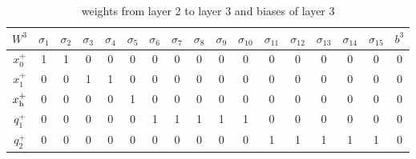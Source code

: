 \begin{table}[t]
	\centering
	\begin{tabular}{|c| c c c c c c c c c c c c c c c |c|}
		\hline 
		$W^3$ & $\sigma_1$ & $\sigma_2$ & $\sigma_3$ & $\sigma_4$ & $\sigma_5$ & $\sigma_6$ & $\sigma_7$ & $\sigma_8$ & $\sigma_9$ &  $\sigma_{10}$ & $\sigma_{11}$ & $\sigma_{12}$ & $\sigma_{13}$ & $\sigma_{14}$ & $\sigma_{15}$ & $b^3$ \\
		\hline
		$x_0^+$ & 1 & 1 & 0 & 0 & 0 & 0 & 0 & 0 & 0 & 0 & 0 & 0 & 0 & 0 & 0 & 0 \\
		$x_1^+$ & 0 & 0 & 1 & 1 & 0 & 0 & 0 & 0 & 0 & 0 & 0 & 0 & 0 & 0 & 0 & 0 \\
		$x_{\mathrm{h}}^+$ & 0 & 0 & 0 & 0 & 1 & 0 & 0 & 0 & 0 & 0 & 0 & 0 & 0 & 0 & 0 & 0 \\
		$q_1^+$ & 0 & 0 & 0 & 0 & 0 & 1 & 1 & 1 & 1 & 1 & 0 & 0 & 0 & 0 & 0 & 0 \\
		$q_2^+$ & 0 & 0 & 0 & 0 & 0 & 0 & 0 & 0 & 0 & 0 & 1 & 1 & 1 & 1 & 1 & 0 \\
		\hline
	\end{tabular}
	\caption{weights from layer 2 to layer 3 and biases of layer 3}
	\label{tab:W3b3ex}
\end{table}